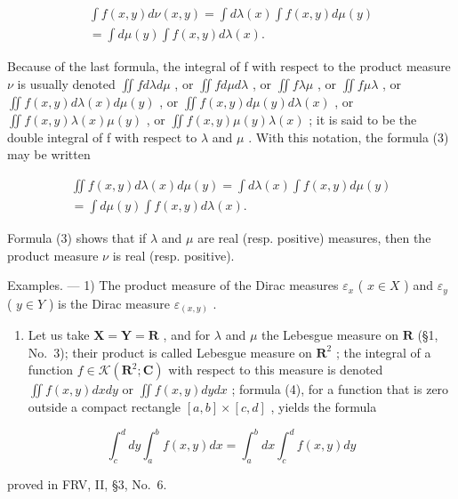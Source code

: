 \[
\begin{array}{c} \int f (x, y) d \nu (x, y) = \int d \lambda (x) \int f (x, y) d \mu (y) \\ = \int d \mu (y) \int f (x, y) d \lambda (x). \end{array}\tag{3}
\]

Because of the last formula, the integral of f with respect to the product measure \(\nu\) is usually denoted \(\iint f d\lambda d\mu\) , or \(\iint f d\mu d\lambda\) , or \(\iint f \lambda \mu\) , or \(\iint f \mu \lambda\) , or \(\iint f(x, y) d\lambda(x) d\mu(y)\) , or \(\iint f(x, y) d\mu(y) d\lambda(x)\) , or \(\iint f(x, y) \lambda(x)\mu(y)\) , or \(\iint f(x, y) \mu(y)\lambda(x)\) ; it is said to be the double integral of f with respect to \(\lambda\) and \(\mu\) . With this notation, the formula (3) may be written

\[
\begin{array}{c} \iint f (x, y) d \lambda (x) d \mu (y) = \int d \lambda (x) \int f (x, y) d \mu (y) \\ = \int d \mu (y) \int f (x, y) d \lambda (x). \end{array}\tag{4}
\]

Formula (3) shows that if \(\lambda\) and \(\mu\) are real (resp. positive) measures, then the product measure \(\nu\) is real (resp. positive).

Examples. --- 1) The product measure of the Dirac measures \(\varepsilon_{x}\) ( \(x \in X\) ) and \(\varepsilon_{y}\) ( \(y \in Y\) ) is the Dirac measure \(\varepsilon_{(x,y)}\) .

\begin{enumerate}
\def\labelenumi{\arabic{enumi})}
\setcounter{enumi}{1}
\tightlist
\item
  Let us take \(\mathbf{X} = \mathbf{Y} = \mathbf{R}\) , and for \(\lambda\) and \(\mu\) the Lebesgue measure on \(\mathbf{R}\) (§1, No.~3); their product is called Lebesgue measure on \(\mathbf{R}^2\) ; the integral of a function \(f \in \mathcal{K}(\mathbf{R}^2; \mathbf{C})\) with respect to this measure is denoted \(\iint f(x, y) dx dy\) or \(\iint f(x, y) dy dx\) ; formula (4), for a function that is zero outside a compact rectangle \([a, b] \times [c, d]\) , yields the formula
\end{enumerate}

\[
\int_ {c} ^ {d} d y \int_ {a} ^ {b} f (x, y) d x = \int_ {a} ^ {b} d x \int_ {c} ^ {d} f (x, y) d y
\]

proved in FRV, II, §3, No.~6.

